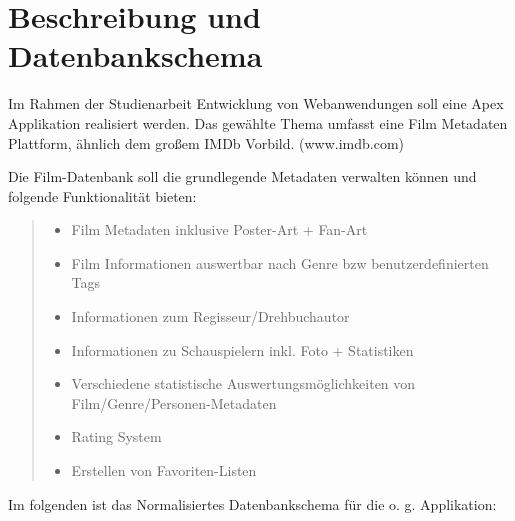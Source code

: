 \documentclass[a4paper]{article}
\begin{document}


\section{Beschreibung und Datenbankschema%
  \label{beschreibung-und-datenbankschema}%
}

Im Rahmen der Studienarbeit Entwicklung von Webanwendungen soll eine Apex
Applikation realisiert werden. Das gewählte Thema umfasst eine Film Metadaten
Plattform, ähnlich dem großem IMDb Vorbild. (www.imdb.com)

Die Film-Datenbank soll die grundlegende Metadaten verwalten können und folgende
Funktionalität bieten:
%
\begin{quote}
%
\begin{itemize}

\item Film Metadaten inklusive Poster-Art + Fan-Art

\item Film Informationen auswertbar nach Genre bzw benutzerdefinierten Tags

\item Informationen zum Regisseur/Drehbuchautor

\item Informationen zu Schauspielern inkl. Foto + Statistiken

\item Verschiedene statistische Auswertungsmöglichkeiten von
Film/Genre/Personen-Metadaten

\item Rating System

\item Erstellen von Favoriten-Listen

\end{itemize}

\end{quote}

Im folgenden ist das Normalisiertes Datenbankschema für die o. g. Applikation:
\end{document}
